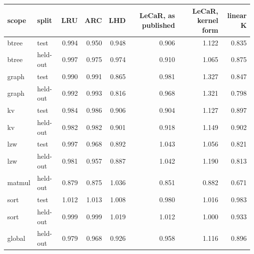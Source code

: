 \begin{tabular}{llrrrrrr}
\toprule
scope & split & LRU & ARC & LHD & LeCaR, as published & LeCaR, kernel form & linear K \\
\midrule
btree & test & 0.994 & 0.950 & 0.948 & 0.906 & 1.122 & 0.835 \\
btree & held-out & 0.997 & 0.975 & 0.974 & 0.910 & 1.065 & 0.875 \\
graph & test & 0.990 & 0.991 & 0.865 & 0.981 & 1.327 & 0.847 \\
graph & held-out & 0.992 & 0.993 & 0.816 & 0.968 & 1.321 & 0.798 \\
kv & test & 0.984 & 0.986 & 0.906 & 0.904 & 1.127 & 0.897 \\
kv & held-out & 0.982 & 0.982 & 0.901 & 0.918 & 1.149 & 0.902 \\
lzw & test & 0.997 & 0.968 & 0.892 & 1.043 & 1.056 & 0.821 \\
lzw & held-out & 0.981 & 0.957 & 0.887 & 1.042 & 1.190 & 0.813 \\
matmul & held-out & 0.879 & 0.875 & 1.036 & 0.851 & 0.882 & 0.671 \\
sort & test & 1.012 & 1.013 & 1.008 & 0.980 & 1.016 & 0.983 \\
sort & held-out & 0.999 & 0.999 & 1.019 & 1.012 & 1.000 & 0.933 \\
global & held-out & 0.979 & 0.968 & 0.926 & 0.958 & 1.116 & 0.896 \\
\bottomrule
\end{tabular}

